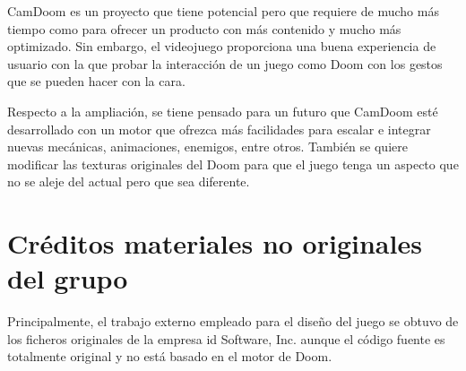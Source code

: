 \documentclass{article}
\begin{document}
CamDoom es un proyecto que tiene potencial pero que requiere de mucho
más tiempo como para ofrecer un producto con más contenido y mucho más
optimizado. Sin embargo, el videojuego proporciona una buena experiencia
de usuario con la que probar la interacción de un juego como Doom con los
gestos que se pueden hacer con la cara.

Respecto a la ampliación, se tiene pensado para un futuro que CamDoom
esté desarrollado con un motor que ofrezca más facilidades para escalar
e integrar nuevas mecánicas, animaciones, enemigos, entre otros. También
se quiere modificar las texturas originales del Doom para que el juego
tenga un aspecto que no se aleje del actual pero que sea diferente.

\section{Créditos materiales no originales del grupo}

Principalmente, el trabajo externo empleado para el diseño del juego
se obtuvo de los ficheros originales de la empresa id Software, Inc. aunque
el código fuente es totalmente original y no está basado en el motor de Doom.
\end{document}
